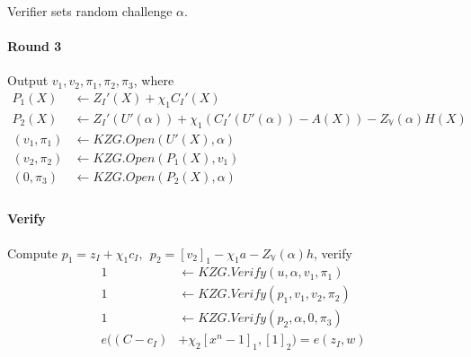 \documentclass{article}
\theoremstyle{definition}
\begin{document}
Verifier sets random challenge $\alpha$.

\paragraph{Round 3}
Output $v_1, v_2, \pi_1, \pi_2, \pi_3$, where
\begin{align*}
	P_1(X) &\leftarrow Z_I'(X) + \chi_1 C_I'(X)\\
	P_2(X) &\leftarrow Z_I'(U'(\alpha)) + \chi_1 (C_I'(U'(\alpha)) - A(X)) - Z_{\mathbb{V}}(\alpha) H(X)\\
	(v_1, \pi_1) &\leftarrow KZG.Open(U'(X), \alpha)\\
	(v_2, \pi_2) &\leftarrow KZG.Open(P_1(X), v_1)\\
	(0, \pi_3) &\leftarrow KZG.Open(P_2(X), \alpha)\\
\end{align*}

\paragraph{Verify}
Compute $p_1 = z_I + \chi_1 c_I, ~~ p_2= [v_2]_1 - \chi_1 a - Z_{\mathbb{V}}(\alpha) h$, verify
\begin{align*}
	1 &\leftarrow KZG.Verify(u, \alpha, v_1, \pi_1)\\
	1 &\leftarrow KZG.Verify(p_1, v_1, v_2, \pi_2)\\
	1 &\leftarrow KZG.Verify(p_2, \alpha, 0, \pi_3)\\
	e((C-c_I) &+ \chi_2[x^n -1]_1, [1]_2) = e(z_I, w)
\end{align*}



\end{document}

